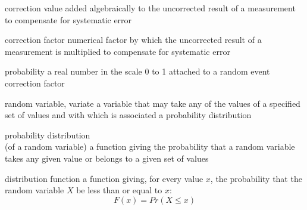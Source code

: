\documentclass[avery5371,grid]{flashcards}
\begin{document}
\begin{flashcard}[Definition]{correction}
\vspace{\fill}
    value added algebraically to the uncorrected result of a measurement to compensate for systematic error
\vspace{\fill}
\end{flashcard}

\begin{flashcard}[Definition]{correction factor}
\vspace{\fill}
    numerical factor by which the uncorrected result of a measurement is multiplied to compensate for systematic error
\vspace{\fill}
\end{flashcard}


\begin{flashcard}[Definition]{probability}
\vspace{\fill}
    a real number in the scale 0 to 1 attached to a random event correction factor
\vspace{\fill}
\end{flashcard}

\begin{flashcard}[Definition]{random variable, variate}
\vspace{\fill}
    a variable that may take any of the values of a specified set of values and with which is associated a probability distribution
\vspace{\fill}
\end{flashcard}

\begin{flashcard}[Definition]{probability distribution \\ (of a random variable)}
\vspace{\fill}
    a function giving the probability that a random variable takes any given value or belongs to a given set of values
\vspace{\fill}
\end{flashcard}

\begin{flashcard}[Definition]{distribution function}
\vspace{\fill}
    a function giving, for every value $x$,
        the probability that the random variable $X$ be less than or equal to $x$:
    \begin{equation*}
        F ( x ) = Pr ( X \leq x )
    \end{equation*}
\vspace{\fill}
\end{flashcard}
\end{document}
